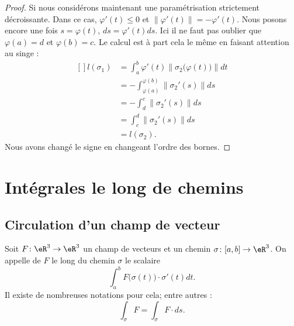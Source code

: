 \begin{proof}
    Si nous considérons maintenant une paramétrisation strictement décroissante. Dans ce cas, $\varphi'(t)\leq 0$ et $\| \varphi'(t) \|=-\varphi'(t)$. Nous posons encore une fois $s=\varphi(t)$, $ds=\varphi'(t)ds$. Ici il ne faut pas oublier que $\varphi(a)=d$ et $\varphi(b)=c$. Le calcul est à part cela le même en faisant attention au singe :
    \begin{equation}
        \begin{aligned}[]
            l(\sigma_1)&=\int_a^b\varphi'(t)\| \sigma_2\big( \varphi(t) \big) \|dt\\
            &=-\int_{\varphi(a)}^{\varphi(b)}\| \sigma_2'(s) \|ds\\
            &=-\int_d^c\| \sigma_2'(s) \|ds\\
            &=\int_c^d\| \sigma_2'(s) \|ds\\
            &=l(\sigma_2).
        \end{aligned}
    \end{equation}
    Nous avons changé le signe en changeant l'ordre des bornes.
\end{proof}

\section{Intégrales le long de chemins}

\subsection{Circulation d'un champ de vecteur}

\begin{definition}
    Soit $F\colon \eR^3\to \eR^3$ un champ de vecteurs et un chemin $\sigma\colon \mathopen[ a , b \mathclose]\to \eR^3$. On appelle  de $F$ le long du chemin $\sigma$ le scalaire
    \begin{equation}        \label{EqDeffvkZwh}
        \int_a^b F\big( \sigma(t) \big)\cdot \sigma'(t)dt.
    \end{equation}
    Il existe de nombreuses notations pour cela; entre autres :
    \begin{equation}
        \int_{\sigma}F=\int_{\sigma} F\cdot ds.
    \end{equation}
\end{definition}

